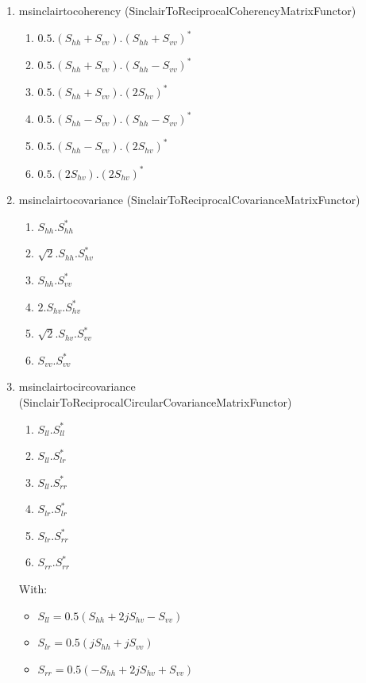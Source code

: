 \begin{enumerate}
\renewcommand{\labelenumii}{Channel \arabic{enumii} : }
\item msinclairtocoherency (SinclairToReciprocalCoherencyMatrixFunctor)
\begin{enumerate}
\item $ 0.5 . (S_{hh}+S_{vv}).(S_{hh}+S_{vv})^{*} $
\item $ 0.5 . (S_{hh}+S_{vv}).(S_{hh}-S_{vv})^{*} $
\item $ 0.5 . (S_{hh}+S_{vv}).(2 S_{hv})^{*} $
\item $ 0.5 . (S_{hh}-S_{vv}).(S_{hh}-S_{vv})^{*} $
\item $ 0.5 . (S_{hh}-S_{vv}).(2 S_{hv})^{*} $
\item $ 0.5 . (2 S_{hv}).(2 S_{hv})^{*} $
\end{enumerate}
 
\item msinclairtocovariance (SinclairToReciprocalCovarianceMatrixFunctor)
\begin{enumerate}
\item $ S_{hh}.S_{hh}^{*} $ 
\item $ \sqrt{2}.S_{hh}.S_{hv}^{*} $ 
\item $ S_{hh}.S_{vv}^{*} $ 
\item $ 2.S_{hv}.S_{hv}^{*} $ 
\item $ \sqrt{2}.S_{hv}.S_{vv}^{*} $ 
\item $ S_{vv}.S_{vv}^{*} $
\end{enumerate}
 
\item msinclairtocircovariance (SinclairToReciprocalCircularCovarianceMatrixFunctor)
\begin{enumerate}
\item $ S_{ll}.S_{ll}^{*} $ 
\item $ S_{ll}.S_{lr}^{*} $ 
\item $ S_{ll}.S_{rr}^{*} $ 
\item $ S_{lr}.S_{lr}^{*} $ 
\item $ S_{lr}.S_{rr}^{*} $ 
\item $ S_{rr}.S_{rr}^{*} $
\end{enumerate}

With:
\begin{itemize} 
\item $ S_{ll} = 0.5(S_{hh}+2j S_{hv}-S_{vv}) $ 
\item $ S_{lr} = 0.5(j S_{hh}+j S_{vv}) $  
\item $ S_{rr} = 0.5(-S_{hh}+2j S_{hv}+S_{vv}) $ 
\end{itemize}
 

\end{enumerate}
